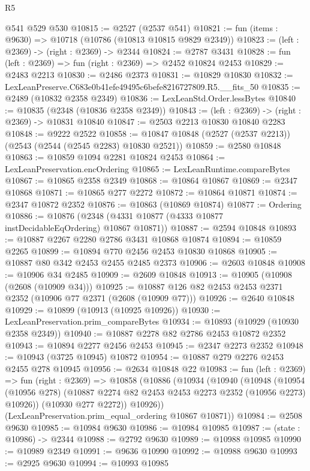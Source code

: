\begin{lexlean}{R5}
\begin{coremodule}
    @541
    @529
    @530
@10815 := @2527 (@2537 @541)
@10821 := fun (items : @9630) => @10718 (@10786 (@10813 @10815 @9829 @2349))
@10823 := (left : @2369) -> (right : @2369) -> @2344
@10824 := @2787 @3431
@10828 := fun (left : @2369) => fun (right : @2369) => @2452 @10824 @2453
@10829 := @2483 @2213
@10830 := @2486 @2373
@10831 := @10829 @10830
@10832 := LexLeanPreserve.C683e0b41efe49495c6befe8216727809.R5.__fits_50
@10835 := @2489 (@10832 @2358 @2349)
@10836 := LexLeanStd.Order.lessBytes
@10840 := @10835 (@2348 (@10836 @2358 @2349))
@10843 := (left : @2369) -> (right : @2369) -> @10831 @10840
@10847 := @2503 @2213 @10830 @10840 @2283
@10848 := @9222 @2522
@10858 := @10847 @10848 (@2527 (@2537 @2213)) (@2543 (@2544 (@2545 @2283) @10830 @2521))
@10859 := @2580 @10848
@10863 := @10859 @1094 @2281 @10824 @2453
@10864 := LexLeanPreservation.encOrdering
@10865 := LexLeanRuntime.compareBytes
@10867 := @10865 @2358 @2349
@10868 := @10864 @10867
@10869 := @2347 @10868
@10871 := @10865 @277 @2272
@10872 := @10864 @10871
@10874 := @2347 @10872 @2352
@10876 := @10863 (@10869 @10874)
@10877 := Ordering
@10886 := @10876 (@2348 (@4331 @10877 (@4333 @10877 instDecidableEqOrdering) @10867 @10871))
@10887 := @2594 @10848
@10893 := @10887 @2267 @2280 @2786 @3431 @10868 @10874
@10894 := @10859 @2265
@10899 := @10894 @770 @2456 @2453 @10830 @10868
@10905 := @10887 @80 @342 @2453 @2455 @2485 @2373
@10906 := @2603 @10848
@10908 := @10906 @34 @2485
@10909 := @2609 @10848
@10913 := @10905 (@10908 (@2608 (@10909 @34)))
@10925 := @10887 @126 @82 @2453 @2453 @2371 @2352 (@10906 @77 @2371 (@2608 (@10909 @77)))
@10926 := @2640 @10848
@10929 := @10899 (@10913 (@10925 @10926))
@10930 := LexLeanPreservation.prim_compareBytes
@10934 := @10893 (@10929 (@10930 @2358 @2349))
@10940 := @10887 @2278 @82 @2786 @2453 @10872 @2352
@10943 := @10894 @2277 @2456 @2453
@10945 := @2347 @2273 @2352
@10948 := @10943 (@3725 @10945) @10872
@10954 := @10887 @279 @2276 @2453 @2455 @278 @10945
@10956 := @2634 @10848 @22
@10983 := fun (left : @2369) =>
  fun (right : @2369) =>
  @10858
    (@10886
      (@10934
        (@10940
          (@10948
            (@10954 (@10956 @278) (@10887 @2274 @82 @2453 @2453 @2273 @2352 (@10956 @2273) @10926))
            (@10930 @277 @2272))
          @10926))
      (LexLeanPreservation.prim_equal_ordering @10867 @10871))
@10984 := @2508 @9630
@10985 := @10984 @9630
@10986 := @10984 @10985
@10987 := (state : @10986) -> @2344
@10988 := @2792 @9630
@10989 := @10988 @10985
@10990 := @10989 @2349
@10991 := @9636 @10990
@10992 := @10988 @9630
@10993 := @2925 @9630
@10994 := @10993 @10985

\end{coremodule}
\end{lexlean}
